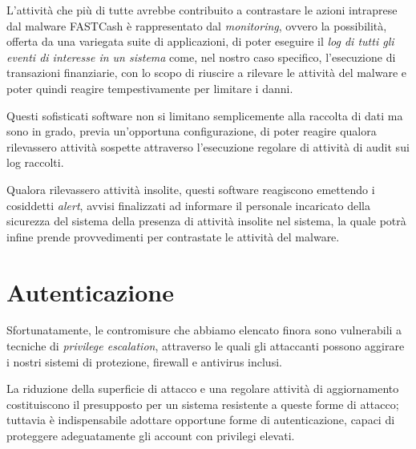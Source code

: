 \documentclass[10pt,a4paper, titlepage]{report}
\begin{document}
L'attività che più di tutte avrebbe contribuito a contrastare le azioni intraprese dal malware FASTCash è rappresentato dal \textit{monitoring}, ovvero la possibilità, offerta da una variegata suite di applicazioni, di poter eseguire il \textit{log di tutti gli eventi di interesse in un sistema} come, nel nostro caso specifico, l'esecuzione di transazioni finanziarie, con lo scopo di riuscire a rilevare le attività del malware e poter quindi reagire tempestivamente per limitare i danni.

Questi sofisticati software non si limitano semplicemente alla raccolta di dati ma sono in grado, previa un'opportuna configurazione, di poter reagire qualora rilevassero attività sospette attraverso l'esecuzione regolare di attività di audit sui log raccolti. 

Qualora rilevassero attività insolite, questi software reagiscono emettendo i cosiddetti \textit{alert}, avvisi finalizzati ad informare il personale incaricato della sicurezza del sistema della presenza di attività insolite nel sistema, la quale potrà infine prende provvedimenti per contrastate le attività del malware.  

\section{Autenticazione}

Sfortunatamente, le contromisure che abbiamo elencato finora sono vulnerabili a tecniche di \textit{privilege escalation}, attraverso le quali gli attaccanti possono aggirare i nostri sistemi di protezione, firewall e antivirus inclusi.

La riduzione della superficie di attacco e una regolare attività di aggiornamento costituiscono il presupposto per un sistema resistente a queste forme di attacco; tuttavia è indispensabile adottare opportune forme di autenticazione, capaci di proteggere adeguatamente gli account con privilegi elevati.
\end{document}
